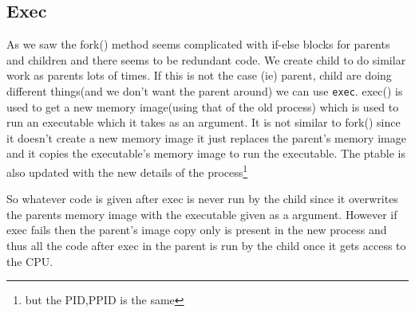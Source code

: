 \documentclass[12pt]{article}
\newcommand{\tbox}[1]{\noindent\fbox{\parbox{\textwidth}{#1}}}
\begin{document}
\subsection{Exec}
As we saw the fork() method seems complicated with if-else blocks for parents and children and there seems to be redundant code. We create
child to do similar work as parents lots of times. If this is not the case (ie) parent, child are doing different things(and we don't want the parent around) we can use \texttt{exec}.
exec() is used to get a new memory image(using that of the old process) which is used to run an executable which it takes as an argument. It is not similar to fork() since it doesn't create a new memory image
it just replaces the parent's memory image and it copies the executable's memory image to run the executable. The ptable is also updated with the new details of the process\footnote{but the PID,PPID is the same}


So whatever code is given after exec is never run by the child since it overwrites the parents memory image with the executable given as a argument. However if 
exec fails then the parent's image copy only is present in the new process and thus all the code after exec in the parent is run by the child once it gets access to the CPU. 


\noindent\tbox{
    \begin{center}
    \textbf{\Huge Lecture 5}
    \end{center}
}
\end{document}
